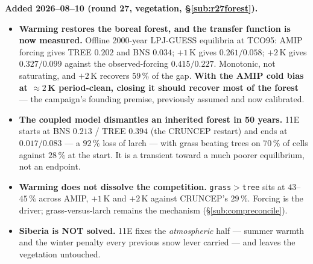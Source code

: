 \documentclass[10pt]{article}
\begin{document}
\textbf{Added 2026--08--10 (round 27, vegetation, \S\ref{sub:r27forest}).}
\begin{itemize}\itemsep2pt
\item \textbf{Warming restores the boreal forest, and the transfer function is now
measured.} Offline 2000-year LPJ-GUESS equilibria at TCO95: AMIP forcing gives TREE
$0.202$ and BNS $0.034$; $+1$\,K gives $0.261/0.058$; $+2$\,K gives $0.327/0.099$ against
the observed-forcing $0.415/0.227$. Monotonic, not saturating, and $+2$\,K recovers
$59\,\%$ of the gap. \textbf{With the AMIP cold bias at ${\approx}2$\,K period-clean,
closing it should recover most of the forest} --- the campaign's founding premise,
previously assumed and now calibrated.
\item \textbf{The coupled model dismantles an inherited forest in 50 years.} 11E starts at
BNS $0.213$ / TREE $0.394$ (the CRUNCEP restart) and ends at $0.017/0.083$ --- a $92\,\%$
loss of larch --- with grass beating trees on $70\,\%$ of cells against $28\,\%$ at the
start. It is a transient toward a much poorer equilibrium, not an endpoint.
\item \textbf{Warming does not dissolve the competition.} \texttt{grass$>$tree} sits at
$43$--$45\,\%$ across AMIP, $+1$\,K and $+2$\,K against CRUNCEP's $29\,\%$. Forcing is the
driver; grass-versus-larch remains the mechanism (\S\ref{sub:compreconcile}).
\item \textbf{Siberia is NOT solved.} 11E fixes the \emph{atmospheric} half --- summer
warmth and the winter penalty every previous snow lever carried --- and leaves the
vegetation untouched.
\end{itemize}
\end{document}
